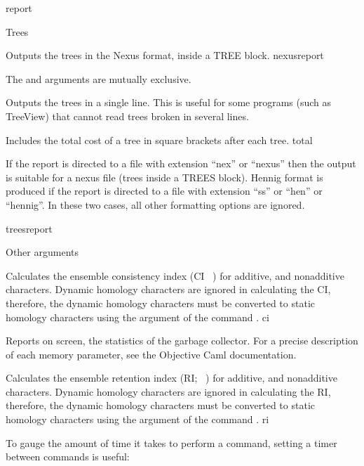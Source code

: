 \begin{command}{report}{}
\begin{arguments}
\begin{argumentgroup}{Trees}
{\begin{description}
{Outputs the trees in the Nexus format, inside a TREE block.}
{nexusreport}

\begin{statement}
The  and  arguments are 
mutually exclusive.
\end{statement}

{Outputs the trees in a single line. This is useful for
some programs (such as TreeView) that cannot read
trees broken in several
lines.}
{}

{Includes the total cost of a tree in square brackets after each tree.}
{total}

\end{description}

If the report is directed to a file with extension ``nex'' or ``nexus'' then
the output is suitable for a nexus file (trees inside a TREES
block). Hennig format is produced if the report is directed
to a file with extension ``ss'' or ``hen'' or ``hennig''. In
these two cases, all other formatting options are ignored.}
{treesreport}

\end{argumentgroup}

\begin{argumentgroup}{Other arguments}
{} 

{Calculates the ensemble consistency index (CI ~\cite{farris1989,
klugeandfarris1969}) for additive, and nonadditive
characters. Dynamic homology characters are ignored in calculating
the CI, therefore, the dynamic homology characters must be converted
to static homology characters using the argument  
of the command .}
{ci}

{Reports on screen, the statistics of
the garbage collector. For a precise description of each memory parameter, see
the Objective Caml documentation.}
{}

{Calculates the ensemble retention index (RI; ~\cite{farris1989}) for additive, and
nonadditive characters. Dynamic homology characters are ignored in calculating
the RI, therefore, the dynamic homology characters must be converted
to static homology characters using the argument  
of the command .}
{ri}

\begin{statement}
To gauge the amount of time it takes \poy to perform a command, 
setting a timer between commands is useful:
\begin{flushleft}
\\
\\
\\
\\
\end{flushleft}


\end{statement}
\end{argumentgroup}
\end{arguments}
\end{command}

